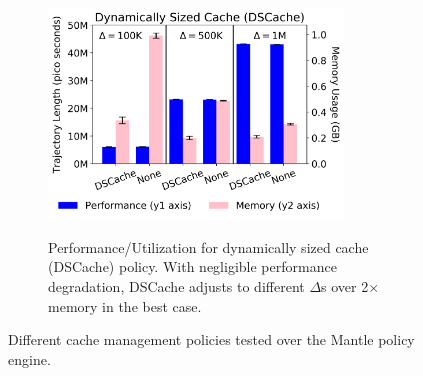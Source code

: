 \begin{figure}[t!]
    ~
    \begin{subfigure}[t]{0.32\textwidth}
        \centering
        \includegraphics[width=0.86\textwidth]{figures/dscache-vs-none.png}\\
	\caption{Performance/Utilization for dynamically sized cache (DSCache)
policy. With negligible performance degradation, DSCache adjusts to different
\(\Delta\)s over 2\(\times\) memory in the best case.
\label{fig:dscache-vs-none}}
    \end{subfigure}%
    \caption{Different cache management policies tested over the Mantle policy engine.}
\end{figure}

%
%
%
%
%
%

